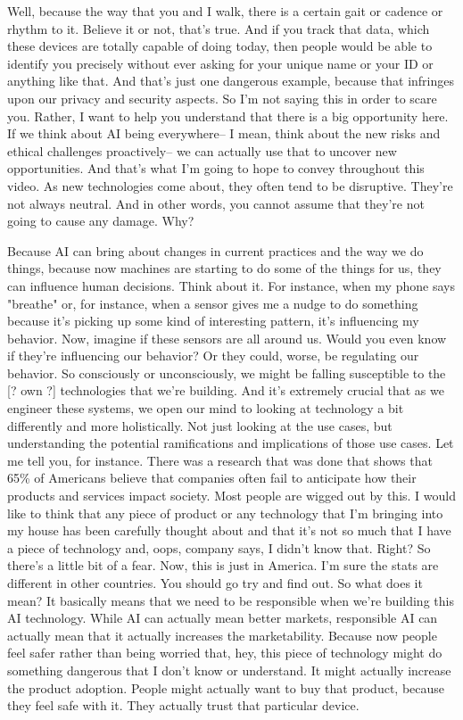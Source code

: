 Well, because the way that you and I walk, there is a certain gait or cadence or rhythm to it.
Believe it or not, that's true.
And if you track that data, which these devices are totally capable of doing today, then people would be able to identify you precisely without ever asking for your unique name or your ID or anything like that.
And that's just one dangerous example, because that infringes upon our privacy and security aspects.
So I'm not saying this in order to scare you.
Rather, I want to help you understand that there is a big opportunity here.
If we think about AI being everywhere-- I mean, think about the new risks and ethical challenges proactively-- we can actually use that to uncover new opportunities.
And that's what I'm going to hope to convey throughout this video.
As new technologies come about, they often tend to be disruptive.
They're not always neutral.
And in other words, you cannot assume that they're not going to cause any
damage.
Why?


Because AI can bring about changes in current practices and the way we do things, because now machines are starting to do some of the things for us, they can influence human decisions.
Think about it.
For instance, when my phone says "breathe" or, for instance, when a sensor gives me a nudge to do something because it's picking up some kind of interesting pattern, it's influencing my behavior.
Now, imagine if these sensors are all around us.
Would you even know if they're influencing our behavior?
Or they could, worse, be regulating our behavior.
So consciously or unconsciously, we might be falling susceptible to the [? own ?] technologies that we're building.
And it's extremely crucial that as we engineer these systems, we open our mind to looking at technology a bit differently and more holistically.
Not just looking at the use cases, but understanding the potential ramifications and implications of those use cases.
Let me tell you, for instance.
There was a research that was done that shows that 65\% of Americans believe that companies often fail to anticipate how their products and services impact society.
Most people are wigged out by this.
I would like to think that any piece of product or any technology that I'm bringing into my house has been carefully thought about and that it's not so much that I have a piece of technology and, oops, company says, I didn't know that.
Right?
So there's a little bit of a fear.
Now, this is just in America.
I'm sure the stats are different in other countries.
You should go try and find out.
So what does it mean?
It basically means that we need to be responsible when we're building this AI technology.
While AI can actually mean better markets, responsible AI can actually mean that it actually increases the marketability.
Because now people feel safer rather than being worried that, hey, this piece of technology might do something dangerous that I don't know or understand.
It might actually increase the product adoption.
People might actually want to buy that product, because they feel safe with it.
They actually trust that particular device.




